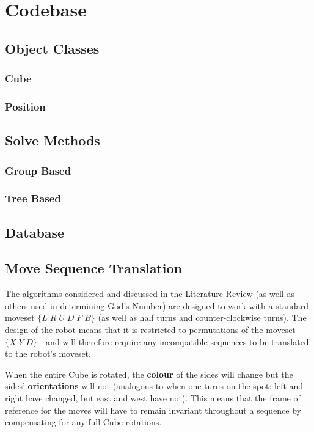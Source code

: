 \documentclass{report}
\begin{document}
    \section{Codebase}
    \subsection{Object Classes}
    \subsubsection{Cube}
    \subsubsection{Position}
    \subsection{Solve Methods}
    \subsubsection{Group Based}
    \subsubsection{Tree Based}
    \subsection{Database}
	\subsection{Move Sequence Translation}
    
    The algorithms considered and discussed in the Literature Review (as well as others used in determining God's Number) are designed to work with a standard moveset $\{L\;R\;U\;D\;F\;B\}$ (as well as half turns and counter-clockwise turns). The design of the robot means that it is restricted to permutations of the moveset $\{X\;Y\;D\}$ - and will therefore require any incompatible sequences to be translated to the robot's moveset.
    
    When the entire Cube is rotated, the \textbf{colour} of the sides will change but the sides' \textbf{orientations} will not (analogous to when one turns on the spot: left and right have changed, but east and west have not). This means that the frame of reference for the moves will have to remain invariant throughout a sequence by compensating for any full Cube rotations.
    
\end{document}
